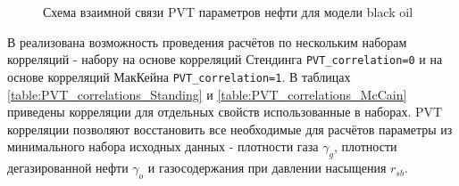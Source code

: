 \begin{figure}[H]
	\caption{Схема взаимной связи PVT параметров нефти для модели black oil \cite{Yukos_PVT_2002}}
	\label{ris:PVT_props}
\end{figure}

В \unf{} реализована возможность проведения расчётов по нескольким наборам корреляций - набору на основе корреляций Стендинга \texttt{PVT_correlation=0} и на основе корреляций МакКейна \texttt{PVT_correlation=1}. В таблицах \ref{table:PVT_correlations_Standing} и \ref{table:PVT_correlations_McCain} приведены корреляции для отдельных свойств использованные в наборах.  PVT корреляции позволяют восстановить все необходимые для расчётов параметры из минимального набора исходных данных - плотности газа $\gamma_g$, плотности дегазированной нефти $\gamma_o$ и газосодержания при давлении насыщения $r_{sb}$. 



